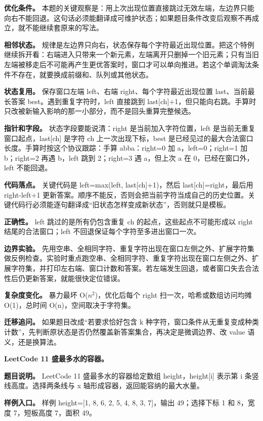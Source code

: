 \textbf{优化条件。} 本题的关键观察是：用上次出现位置直接跳过无效左端，左边界只能向右不能回退。这句话必须能翻译成可维护状态；如果题目条件改变后观察不再成立，就不能继续套原来的写法。

\textbf{相邻状态。} 规律是左边界只向右，状态保存每个字符最近出现位置。把这个特例继续拆开看：右端进入只带来一个新元素，左端离开只删掉一个旧元素；只有当旧左端被移走后不可能再产生更优答案时，窗口才可以单向推进。若这个单调淘汰条件不存在，就要换成前缀和、队列或其他状态。

\textbf{状态复用。} 保存窗口左端 left、右端 right、每个字符最近出现位置 last、当前最长答案 best。遇到重复字符时，left 直接跳到 last[ch]+1，但只能向右跳。手算时只改被新输入影响的那一小部分，而不是回头重算完整候选。

\textbf{指针和字段。} 状态字段要能说清：right 是当前加入字符位置，left 是当前无重复窗口起点，last[ch] 是字符 ch 上一次出现下标，best 是已经见过的最大合法窗口长度。手算时按这个协议跟踪：手算 abba：right=0 加 a，left=0；right=1 加 b；right=2 再遇 b，left 跳到 2；right=3 遇 a，但上次 a 在 0，已经在窗口外，left 不能回退。

\textbf{代码落点。} 关键代码是 left=max(left, last[ch]+1)，然后 last[ch]=right，最后用 right-left+1 更新答案。顺序不能反，否则会把当前字符当成自己的历史位置。关键代码行必须能逐句翻译成“旧状态怎样变成新状态”，否则就只是模板。

\textbf{正确性。} left 跳过的是所有仍包含重复 ch 的起点，这些起点不可能形成以 right 结尾的合法窗口；left 不回退保证每个字符至多进出窗口一次。

\textbf{边界实验。} 先用空串、全相同字符、重复字符出现在窗口左侧之外、扩展字符集做反例检查。实验时重点跑空串、全相同字符、重复字符出现在窗口左侧之外、扩展字符集，并打印左右端、窗口计数和答案。若左端发生回退，或者窗口失去合法性后仍更新答案，就能很快定位错误。

\textbf{复杂度变化。} 暴力最坏 O(\ensuremath{n^{2}})，优化后每个 right 扫一次，哈希或数组访问均摊 O(1)，总时间 O(n)，空间取决于字符集。

\textbf{迁移追问。} 如果题目改成“若要求恰好包含 k 种字符，窗口条件从无重复变成种类计数”，先判断原状态是否仍然覆盖新答案集合，再决定是微调边界、改 value 语义，还是换算法。

\noindent\textbf{LeetCode 11 盛最多水的容器。}

\textbf{题目说明。} LeetCode 11 盛最多水的容器给定数组 height，height[i] 表示第 i 条竖线高度。选择两条线与 x 轴形成容器，返回能容纳的最大水量。

\textbf{样例入口。} 样例 height=[1, 8, 6, 2, 5, 4, 8, 3, 7]，输出 49；选择下标 1 和 8，宽度 7，短板高度 7，面积 49。

